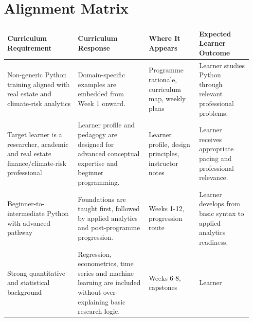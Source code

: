 \documentclass[
  a4paper,
]{article}
\newcounter{none} %
\begin{document}
\section{Alignment Matrix}\label{alignment-matrix}

{\def\LTcaptype{none} %
\begin{longtable}[]{@{}
  >{\raggedright\arraybackslash}p{}
  >{\raggedright\arraybackslash}p{}
  >{\raggedright\arraybackslash}p{}
  >{\raggedright\arraybackslash}p{}@{}}
\toprule\noalign{}
\begin{minipage}[b]{\linewidth}\raggedright
Curriculum Requirement
\end{minipage} & \begin{minipage}[b]{\linewidth}\raggedright
Curriculum Response
\end{minipage} & \begin{minipage}[b]{\linewidth}\raggedright
Where It Appears
\end{minipage} & \begin{minipage}[b]{\linewidth}\raggedright
Expected Learner Outcome
\end{minipage} \\
\midrule\noalign{}
\endhead
\bottomrule\noalign{}
\endlastfoot
Non-generic Python training aligned with real estate and climate-risk
analytics & Domain-specific examples are embedded from Week 1 onward. &
Programme rationale, curriculum map, weekly plans & Learner studies
Python through relevant professional problems. \\
Target learner is a researcher, academic and real estate
finance/climate-risk professional & Learner profile and pedagogy are
designed for advanced conceptual expertise and beginner programming. &
Learner profile, design principles, instructor notes & Learner receives
appropriate pacing and professional relevance. \\
Beginner-to-intermediate Python with advanced pathway & Foundations are
taught first, followed by applied analytics and post-programme
progression. & Weeks 1-12, progression route & Learner develops from
basic syntax to applied analytics readiness. \\
Strong quantitative and statistical background & Regression,
econometrics, time series and machine learning are included without
over-explaining basic research logic. & Weeks 6-8, capstones & Learner

\end{longtable}}
\end{document}
